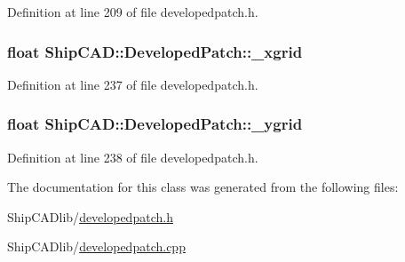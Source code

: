 Definition at line 209 of file developedpatch.\+h.

\subsubsection[{\texorpdfstring{\+\_\+xgrid}{_xgrid}}]{\setlength{\rightskip}{0pt plus 5cm}float Ship\+C\+A\+D\+::\+Developed\+Patch\+::\+\_\+xgrid\hspace{0.3cm}{\ttfamily [protected]}}\hypertarget{classShipCAD_1_1DevelopedPatch_a573e309a7022ad3b2eef7441b1f9f663}{}\label{classShipCAD_1_1DevelopedPatch_a573e309a7022ad3b2eef7441b1f9f663}


Definition at line 237 of file developedpatch.\+h.

\subsubsection[{\texorpdfstring{\+\_\+ygrid}{_ygrid}}]{\setlength{\rightskip}{0pt plus 5cm}float Ship\+C\+A\+D\+::\+Developed\+Patch\+::\+\_\+ygrid\hspace{0.3cm}{\ttfamily [protected]}}\hypertarget{classShipCAD_1_1DevelopedPatch_a501d803bd3252e9949a521cdd6ccff7b}{}\label{classShipCAD_1_1DevelopedPatch_a501d803bd3252e9949a521cdd6ccff7b}


Definition at line 238 of file developedpatch.\+h.



The documentation for this class was generated from the following files\+:\begin{DoxyCompactItemize}
\item 
Ship\+C\+A\+Dlib/\hyperlink{developedpatch_8h}{developedpatch.\+h}\item 
Ship\+C\+A\+Dlib/\hyperlink{developedpatch_8cpp}{developedpatch.\+cpp}\end{DoxyCompactItemize}
